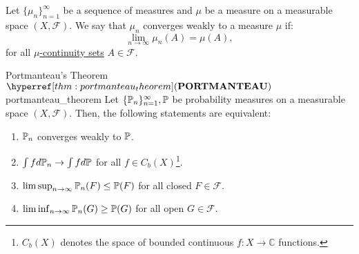 \begin{definition}
    Let $\{\mu_n\}_{n=1}^\infty$ be a sequence of measures and $\mu$ be a measure on a measurable space $(X, \mathcal{F})$. We say that $\mu_n$ converges weakly to a measure $\mu$ if:
    \begin{equation}
        \lim_{n\to\infty}\mu_n(A) = \mu(A),
    \end{equation} 
    \noindent for all \underline{$\mu$-continuity sets} $A\in\mathcal{F}$.
\end{definition} 


\begin{theorem}{Portmanteau's Theorem $\PORT$}{portmanteau_theorem}
    Let $\{\mathbb{P}_n\}_{n=1}^\infty, \mathbb{P}$ be probability measures on a measurable space $(X, \mathcal{F})$. Then, the following statements are equivalent:
    \begin{enumerate}
        \item $\mathbb{P}_n$ converges weakly to $\mathbb{P}$.
        \item $\int fd\mathbb{P}_n \to \int fd\mathbb{P}$ for all $f\in C_b(X)$\footnote{$C_b(X)$ denotes the space of bounded continuous $f:X\to\mathbb{C}$ functions.}.   
        \item $\limsup_{n\to\infty}\mathbb{P}_n(F) \le \mathbb{P}(F)$ for all closed $F\in\mathcal{F}$.
        \item $\liminf_{n\to\infty}\mathbb{P}_n(G) \ge \mathbb{P}(G)$ for all open $G\in\mathcal{F}$.  
    \end{enumerate}  
\end{theorem} 

